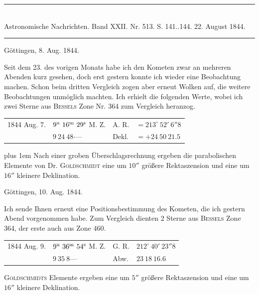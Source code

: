 \clearpage
\hypertarget{native-472-august}{}
\begin{center}
\rule{0.55\linewidth}{0.4pt}\\[2pt]
Astronomische Nachrichten. Band XXII. Nr. 513. S. 141..144. 22. August 1844.\\[2pt]
\rule{0.55\linewidth}{0.4pt}
\end{center}
\begin{flushright}Göttingen, 8. Aug. 1844.\end{flushright}

Seit dem 23. des vorigen Monats habe ich den Kometen zwar an mehreren Abenden kurz gesehen, doch erst gestern konnte ich wieder eine Beobachtung machen. Schon beim dritten Vergleich zogen aber erneut Wolken auf, die weitere Beobachtungen unmöglich machten. Ich erhielt die folgenden Werte, wobei ich zwei Sterne aus \textsc{Bessels} Zone Nr. 364 zum Vergleich heranzog.

\begin{center}
\setlength{\tabcolsep}{3pt}
\begin{tabular}{llll}
1844 Aug. 7. & $9^{\rm u}\ 16^{\rm m}\ 29^{\rm s}$ M. Z. & A. R. & $=213^\circ\ 52'\ 6''8$ \\
 & $9\ 24\ 48\mathord{\cdot}$\quad --- & Dekl. & $=+24\ 50\ 21.5$ \\
\end{tabular}
\end{center}

{\rightskip=0pt plus 1em Nach einer groben Überschlagsrechnung ergeben die parabolischen Elemente von Dr. \textsc{Goldschmidt} eine um $10''$ größere Rektaszension und eine um $16''$ kleinere Deklination.\par}

\begin{flushright}Göttingen, 10. Aug. 1844.\end{flushright}

Ich sende Ihnen erneut eine Positionsbestimmung des Kometen, die ich gestern Abend vorgenommen habe. Zum Vergleich dienten 2 Sterne aus \textsc{Bessels} Zone 364, der erste auch aus Zone 460.

\begin{center}
\setlength{\tabcolsep}{3pt}
\begin{tabular}{llll}
1844 Aug. 9. & $9^{\rm u}\ 36^{\rm m}\ 54^{\rm s}$ M. Z. & G. R. & $212^\circ\ 40'\ 23''8$ \\
 & $9\ 35\ 8$\quad --- & Abw. & $23\ 18\ 16.6$ \\
\end{tabular}
\end{center}

\textsc{Goldschmidts} Elemente ergeben eine um $5''$ größere Rektaszension und eine um $16''$ kleinere Deklination.
